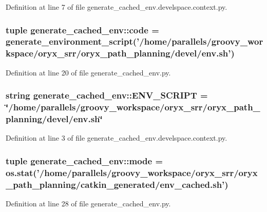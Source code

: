 \-Definition at line 7 of file generate\-\_\-cached\-\_\-env.\-develspace.\-context.\-py.

\subsubsection[{code}]{\setlength{\rightskip}{0pt plus 5cm}tuple {\bf generate\-\_\-cached\-\_\-env\-::code} = generate\-\_\-environment\-\_\-script('/home/parallels/groovy\-\_\-workspace/oryx\-\_\-srr/oryx\-\_\-path\-\_\-planning/devel/env.\-sh')}\label{namespacegenerate__cached__env_ac9bcc622d7ed9c3f04f958d98feb15a2}


\-Definition at line 20 of file generate\-\_\-cached\-\_\-env.\-py.

\subsubsection[{\-E\-N\-V\-\_\-\-S\-C\-R\-I\-P\-T}]{\setlength{\rightskip}{0pt plus 5cm}string {\bf generate\-\_\-cached\-\_\-env\-::\-E\-N\-V\-\_\-\-S\-C\-R\-I\-P\-T} = \char`\"{}/home/parallels/groovy\-\_\-workspace/oryx\-\_\-srr/oryx\-\_\-path\-\_\-planning/devel/env.\-sh\char`\"{}}\label{namespacegenerate__cached__env_a47f2ffa8bf91a11f8c1a26fd677ae040}


\-Definition at line 3 of file generate\-\_\-cached\-\_\-env.\-develspace.\-context.\-py.

\subsubsection[{mode}]{\setlength{\rightskip}{0pt plus 5cm}tuple {\bf generate\-\_\-cached\-\_\-env\-::mode} = os.\-stat('/home/parallels/groovy\-\_\-workspace/oryx\-\_\-srr/oryx\-\_\-path\-\_\-planning/catkin\-\_\-generated/env\-\_\-cached.\-sh')}\label{namespacegenerate__cached__env_a5d4820d9a2d43523818b8013aba84965}


\-Definition at line 28 of file generate\-\_\-cached\-\_\-env.\-py.

